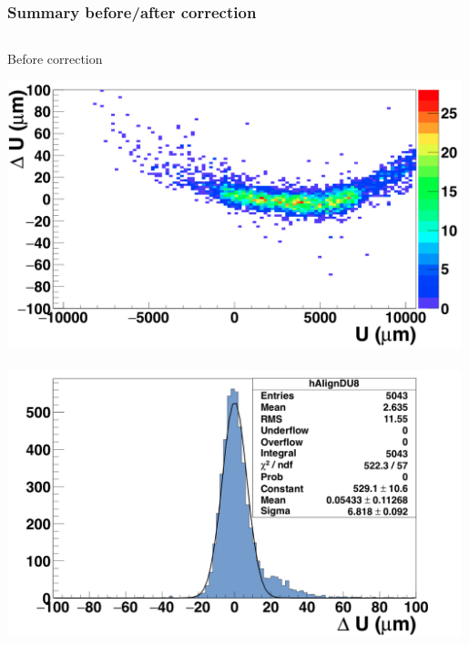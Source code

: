\documentclass{beamer}
\begin{document}
  \begin{frame}
    \frametitle{Summary before/after correction}

    \vspace{-0.35cm}
    \begin{columns}[c]
      \begin{column}{5cm}
        \begin{block}{Before correction}
          \begin{center}
            \includegraphics[width = 0.99\textwidth]{Pictures/deltaUU_8_deformed.png}
            \
            \includegraphics[width = 0.99\textwidth]{Pictures/deltaU_8_deformed.png}
          \end{center}

          \vspace{-0.54cm}
        \end{block}
      \end{column}


\end{columns}
\end{frame}
\end{document}
